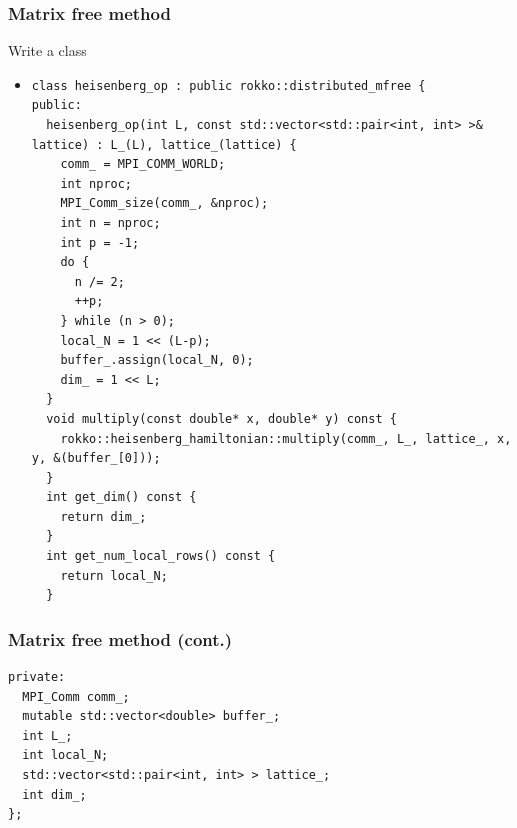 \begin{frame}[c,fragile]
  \frametitle{Matrix free method}
\noindent
Write a class
  \begin{itemize}
  \item {}
\begin{lstlisting}
class heisenberg_op : public rokko::distributed_mfree {
public:
  heisenberg_op(int L, const std::vector<std::pair<int, int> >& lattice) : L_(L), lattice_(lattice) {
    comm_ = MPI_COMM_WORLD;
    int nproc;
    MPI_Comm_size(comm_, &nproc);
    int n = nproc;
    int p = -1;
    do {
      n /= 2;
      ++p;
    } while (n > 0);
    local_N = 1 << (L-p);
    buffer_.assign(local_N, 0);
    dim_ = 1 << L;
  }
  void multiply(const double* x, double* y) const {
    rokko::heisenberg_hamiltonian::multiply(comm_, L_, lattice_, x, y, &(buffer_[0]));
  }
  int get_dim() const {
    return dim_;
  }
  int get_num_local_rows() const {
    return local_N;
  }
\end{lstlisting}
  \end{itemize}
\end{frame}

\begin{frame}[c,fragile]
  \frametitle{Matrix free method (cont.)}
\begin{lstlisting}
private:
  MPI_Comm comm_;
  mutable std::vector<double> buffer_;
  int L_;
  int local_N;
  std::vector<std::pair<int, int> > lattice_;
  int dim_;
};
\end{lstlisting}
\end{frame}



